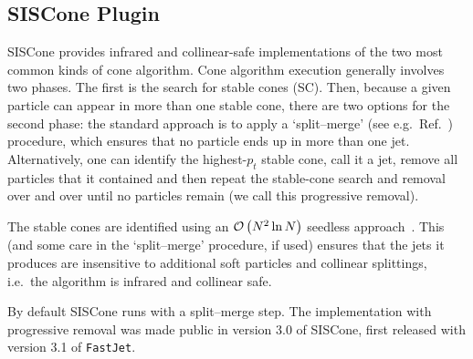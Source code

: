 \documentclass[12pt,a4]{article}
\newcommand{\fastjet}{\texttt{FastJet}\xspace}
\newcommand{\order}[1]{{\cal O}\left(#1\right)}
\begin{document}
\subsection{SISCone Plugin}
\label{sec:siscone-plugin}

SISCone provides infrared and collinear-safe implementations of the
two most common kinds of cone algorithm.
%
Cone algorithm execution generally involves two phases.
%
The first is the search for stable cones (SC).
%
Then, because a given particle can appear in more than one stable
cone, there are two options for the second phase: the standard
approach is to apply a
`split--merge' (see e.g.\ Ref.\ \cite{RunII-jet-physics}) procedure,
which ensures that no particle ends up in more than one jet.
%
Alternatively, one can identify the highest-$p_t$ stable cone, call it a jet,
remove all particles that it contained and then repeat the stable-cone
search and removal over and over until no particles remain (we call
this progressive removal).

The stable cones are identified using an $\order{N^2 \ln N}$ seedless
approach~\cite{SISCone}. This (and some care in the `split--merge'
procedure, if used) ensures that the jets it produces are insensitive
to additional soft particles and collinear splittings, i.e.\ the
algorithm is infrared and collinear safe.

By default SISCone runs with a split--merge step.
%
The implementation with progressive removal was made public in version
3.0 of SISCone, first released with version 3.1 of \fastjet.

% 
% 
\end{document}
